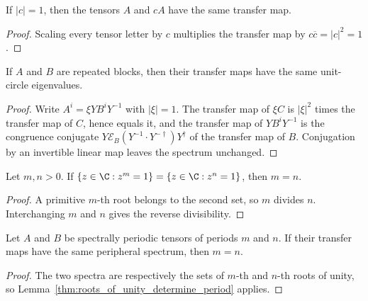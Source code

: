 \begin{lemma}
    \label{thm:transfer_map_smul_unit_norm}
    \leanok
    If $|c|=1$, then the tensors $A$ and $cA$ have the same transfer map.
\end{lemma}
\begin{proof}
    \leanok
    Scaling every tensor letter by $c$ multiplies the transfer map by
    $c\overline c=|c|^2=1$.
\end{proof}

\begin{lemma}
    \label{thm:repeated_blocks_peripheral_spectrum}
    \leanok
    If $A$ and $B$ are repeated blocks, then their transfer maps have the same
    unit-circle eigenvalues.
\end{lemma}
\begin{proof}
    \leanok
    Write $A^i=\xi YB^iY^{-1}$ with $|\xi|=1$.  The transfer map of $\xi C$ is
    $|\xi|^2$ times the transfer map of $C$, hence equals it, and the transfer
    map of $YB^iY^{-1}$ is the congruence conjugate
    $Y\mathcal{E}_B(Y^{-1}\cdot Y^{-\dagger})Y^{\dagger}$ of the transfer map
    of $B$.  Conjugation by an invertible linear map leaves the spectrum
    unchanged.
\end{proof}

\begin{lemma}
    \label{thm:roots_of_unity_determine_period}
    \leanok
    Let $m,n>0$. If
    $\{z\in\C:z^m=1\}=\{z\in\C:z^n=1\}$, then $m=n$.
\end{lemma}
\begin{proof}\leanok
    A primitive $m$-th root belongs to the second set, so $m$ divides $n$.
    Interchanging $m$ and $n$ gives the reverse divisibility.
\end{proof}

\begin{lemma}
    \label{thm:spectral_period_eq_of_peripheral_spectrum}
    \leanok
    Let $A$ and $B$ be spectrally periodic tensors of periods $m$ and $n$. If
    their transfer maps have the same peripheral spectrum, then $m=n$.
\end{lemma}
\begin{proof}
    \leanok
    The two spectra are respectively the sets of $m$-th and $n$-th roots of
    unity, so Lemma~\ref{thm:roots_of_unity_determine_period} applies.
\end{proof}

